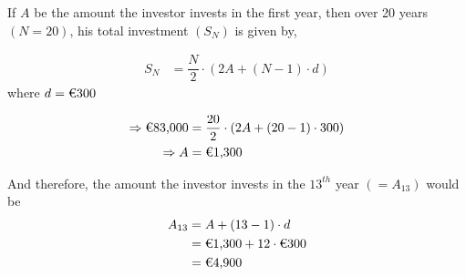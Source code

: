 \begin{solution}[\fullpage]
  If $A$ be the amount the investor invests in the first year, then over 20 years $(N=20)$, his
  total investment $(S_N)$ is given by, 

  \begin{align}
    S_N &= \dfrac{N}{2}\cdot(2A + (N-1)\cdot d)
  \end{align}
  where $d=\text{\texteuro 300}$

  \begin{align}
    \Rightarrow \text{\texteuro 83,000} &= \dfrac{20}{2}\cdot(2A + (20-1)\cdot 300) \\
    \Rightarrow A &= \text{\texteuro 1,300}
  \end{align}

  And therefore, the amount the investor invests in the $13^{th}$ year $(=A_{13})$ would be
  \begin{align}
    A_{13} &= A + (13-1)\cdot d \\
           &= \text{\texteuro 1,300} + 12\cdot \text{\texteuro 300} \\
           &= \text{\texteuro 4,900}
  \end{align}
\end{solution}
